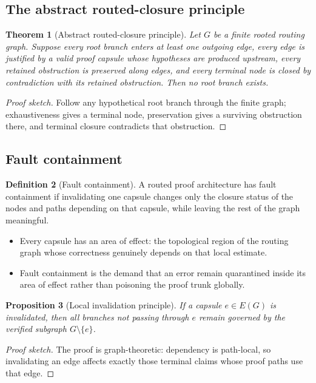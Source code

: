 \documentclass[11pt]{article}
\theoremstyle{plain}
\newtheorem{theorem}{Theorem}[section]
\newtheorem{proposition}[theorem]{Proposition}
\theoremstyle{definition}
\newtheorem{definition}[theorem]{Definition}
\theoremstyle{remark}
\begin{document}
\subsection{The abstract routed-closure principle}
\begin{theorem}[Abstract routed-closure principle]
\label{thm:abstract-routed-closure}
Let $G$ be a finite rooted routing graph.  Suppose every root branch enters at least one outgoing edge, every edge is justified by a valid proof capsule whose hypotheses are produced upstream, every retained obstruction is preserved along edges, and every terminal node is closed by contradiction with its retained obstruction.  Then no root branch exists.
\end{theorem}

\begin{proof}[Proof sketch]
Follow any hypothetical root branch through the finite graph; exhaustiveness gives a terminal node, preservation gives a surviving obstruction there, and terminal closure contradicts that obstruction.
\end{proof}

\subsection{Fault containment}
\begin{definition}[Fault containment]
A routed proof architecture has fault containment if invalidating one capsule changes only the closure status of the nodes and paths depending on that capsule, while leaving the rest of the graph meaningful.
\end{definition}

\begin{itemize}
  \item Every capsule has an area of effect: the topological region of the routing graph whose correctness genuinely depends on that local estimate.
  \item Fault containment is the demand that an error remain quarantined inside its area of effect rather than poisoning the proof trunk globally.
\end{itemize}

\begin{proposition}[Local invalidation principle]
If a capsule $e\in E(G)$ is invalidated, then all branches not passing through $e$ remain governed by the verified subgraph $G\setminus\{e\}$.
\end{proposition}

\begin{proof}[Proof sketch]
The proof is graph-theoretic: dependency is path-local, so invalidating an edge affects exactly those terminal claims whose proof paths use that edge.
\end{proof}
\end{document}
